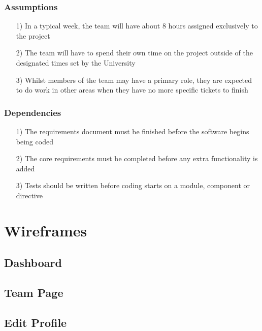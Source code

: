\documentclass[10pt,a4paper]{article}
\begin{document}
\subsubsection*{Assumptions}
\begin{itemize}
\item[1)]
In a typical week, the team will have about 8 hours assigned exclusively to the project

\item[2)]
The team will have to spend their own time on the project outside of the designated times set by the University

\item[3)]
Whilst members of the team may have a primary role, they are expected to do work in other areas when they have no more specific tickets to finish
\end{itemize}

\subsubsection*{Dependencies}
\begin{itemize}
\item[1)]
The requirements document must be finished before the software begins being coded

\item[2)]
The core requirements must be completed before any extra functionality is added

\item[3)]
Tests should be written before coding starts on a module, component or directive
\end{itemize}

\newpage
\section{Wireframes}

\newpage
\subsection{Dashboard}

\newpage
\subsection{Team Page}

\newpage
\subsection{Edit Profile}
\end{document}
